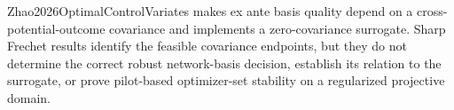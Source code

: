 Zhao2026OptimalControlVariates makes ex ante basis quality depend on a cross-potential-outcome covariance and implements a zero-covariance surrogate.  Sharp Frechet results identify the feasible covariance endpoints, but they do not determine the correct robust network-basis decision, establish its relation to the surrogate, or prove pilot-based optimizer-set stability on a regularized projective domain.